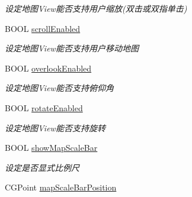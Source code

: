 \begin{DoxyCompactItemize}
\begin{DoxyCompactList}\small\item\em 设定地图\+View能否支持用户缩放(双击或双指单击) \end{DoxyCompactList}\item 
\hypertarget{interface_b_m_k_map_view_adc7ae3120b0edf096ac0eb42f13ed93a}{}B\+O\+O\+L \hyperlink{interface_b_m_k_map_view_adc7ae3120b0edf096ac0eb42f13ed93a}{scroll\+Enabled}\label{interface_b_m_k_map_view_adc7ae3120b0edf096ac0eb42f13ed93a}

\begin{DoxyCompactList}\small\item\em 设定地图\+View能否支持用户移动地图 \end{DoxyCompactList}\item 
\hypertarget{interface_b_m_k_map_view_a8ab1315eb7dadb7db33f2ac568340dec}{}B\+O\+O\+L \hyperlink{interface_b_m_k_map_view_a8ab1315eb7dadb7db33f2ac568340dec}{overlook\+Enabled}\label{interface_b_m_k_map_view_a8ab1315eb7dadb7db33f2ac568340dec}

\begin{DoxyCompactList}\small\item\em 设定地图\+View能否支持俯仰角 \end{DoxyCompactList}\item 
\hypertarget{interface_b_m_k_map_view_acfd7b4dc9bb05e46ffe477b527c61ce0}{}B\+O\+O\+L \hyperlink{interface_b_m_k_map_view_acfd7b4dc9bb05e46ffe477b527c61ce0}{rotate\+Enabled}\label{interface_b_m_k_map_view_acfd7b4dc9bb05e46ffe477b527c61ce0}

\begin{DoxyCompactList}\small\item\em 设定地图\+View能否支持旋转 \end{DoxyCompactList}\item 
\hypertarget{interface_b_m_k_map_view_ad8768aef899c970e88a4cba6f4f7a1bd}{}B\+O\+O\+L \hyperlink{interface_b_m_k_map_view_ad8768aef899c970e88a4cba6f4f7a1bd}{show\+Map\+Scale\+Bar}\label{interface_b_m_k_map_view_ad8768aef899c970e88a4cba6f4f7a1bd}

\begin{DoxyCompactList}\small\item\em 设定是否显式比例尺 \end{DoxyCompactList}\item 
\hypertarget{interface_b_m_k_map_view_a5eeee2f88682636f7e6f891246b03730}{}C\+G\+Point \hyperlink{interface_b_m_k_map_view_a5eeee2f88682636f7e6f891246b03730}{map\+Scale\+Bar\+Position}\label{interface_b_m_k_map_view_a5eeee2f88682636f7e6f891246b03730}


\end{DoxyCompactItemize}
